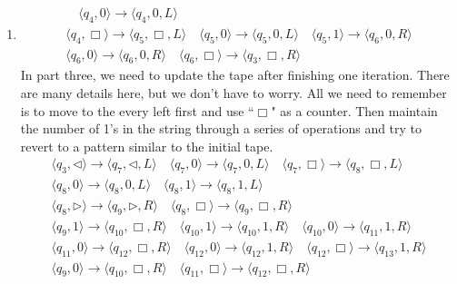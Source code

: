 \documentclass[12pt,a4paper]{article}
\makeatletter
\newtheorem*{solution}{Solution}
\theoremstyle{definition}
\renewenvironment{solution}[1][Solution] {\par\pushQED{\qed}\normalfont\topsep6\p@\@plus6\p@\relax\trivlist\item[\hskip\labelsep\bfseries#1\@addpunct{.}]\ignorespaces}{\popQED\endtrivlist\@endpefalse} \makeatother
\makeatother
\begin{document}
\begin{enumerate}
\begin{solution}
\begin{enumerate}
\begin{align*}
	        \quad
	        \langle q_4, 0 \rangle \rightarrow \langle q_4, 0,  L\rangle\\
	        \langle q_4, \Box \rangle \rightarrow \langle q_5, \Box,  L\rangle
	        \quad
	        \langle q_5, 0 \rangle \rightarrow \langle q_5, 0,  L\rangle
	        \quad
	        \langle q_5, 1 \rangle \rightarrow \langle q_6, 0,  R\rangle\\
	        \langle q_6, 0 \rangle \rightarrow \langle q_6, 0,  R\rangle
	        \quad
	        \langle q_6, \Box \rangle \rightarrow \langle q_3, \Box,  R\rangle
	    \end{align*}
	    In part three, we need to update the tape after finishing one iteration. There are many details here, but we don't have to worry. All we need to remember is to move to the every left first and use ``$\Box$" as a counter. Then maintain the number of 1's in the string through a series of operations and try to revert to a pattern similar to the initial tape.
	    \begin{align*}
	        \langle q_3, \triangleleft \rangle \rightarrow \langle q_7, \triangleleft,  L\rangle
	        \quad
	        \langle q_7, 0 \rangle \rightarrow \langle q_7, 0,  L\rangle
	        \quad
	        \langle q_7, \Box \rangle \rightarrow \langle q_8, \Box,  L\rangle\\
	        \langle q_8, 0 \rangle \rightarrow \langle q_8, 0,  L\rangle
	        \quad
	        \langle q_8, 1 \rangle \rightarrow \langle q_8, 1,  L\rangle
	        \\
	        \langle q_8, \triangleright \rangle \rightarrow \langle q_9, \triangleright,  R\rangle
	        \quad
	        \langle q_8, \Box \rangle \rightarrow \langle q_9, \Box,  R\rangle\\
	        \langle q_9, 1 \rangle \rightarrow \langle q_{10}, \Box,  R\rangle
	        \quad
	        \langle q_{10}, 1 \rangle \rightarrow \langle q_{10}, 1,  R\rangle
	        \quad
	        \langle q_{10}, 0 \rangle \rightarrow \langle q_{11}, 1,  R\rangle\\
	        \langle q_{11}, 0 \rangle \rightarrow \langle q_{12}, \Box,  R\rangle
	        \quad
	        \langle q_{12}, 0 \rangle \rightarrow \langle q_{12}, 1,  R\rangle
	        \quad
	        \langle q_{12}, \Box \rangle \rightarrow \langle q_{13}, 1,  R\rangle\\
	        \langle q_{9}, 0 \rangle \rightarrow \langle q_{10}, \Box,  R\rangle
	        \quad
	        \langle q_{11}, \Box \rangle \rightarrow \langle q_{12}, \Box,  R\rangle
	        \quad 

\end{align*}
\end{enumerate}
\end{solution}
\end{enumerate}
\end{document}

